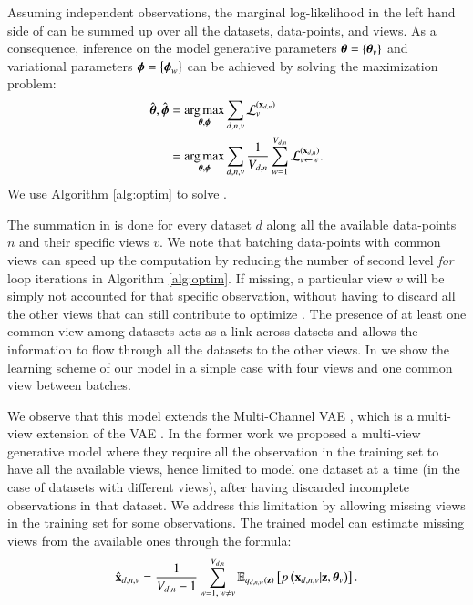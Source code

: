 Assuming independent observations, the marginal log-likelihood in the left hand side of  can be summed up over all the datasets, data-points, and views.
As a consequence, inference on the model generative parameters $\boldsymbol{\theta} = \left\{\boldsymbol{\theta}_v\right\}$ and variational parameters $\boldsymbol{\phi} = \left\{\boldsymbol{\phi}_w\right\}$ can be achieved by solving the maximization problem:
\begin{equation}\label{eq:argmax}
\begin{aligned}
\hat{\boldsymbol{\theta}}, \hat{\boldsymbol{\phi}} &= \underset{\boldsymbol{\theta}, \boldsymbol{\phi}}{\operatorname{arg\,max}} \sum_{d,n,v} \mathcal{L}_v^{(\mathbf{x}_{d,n})} \\
                           &= \underset{\boldsymbol{\theta}, \boldsymbol{\phi}}{\operatorname{arg\,max}} \sum_{d,n,v} \frac{1}{V_{d,n}} \sum_{w=1}^{V_{d,n}} \mathcal{L}_{v \leftarrow w}^{(\mathbf{x}_{d,n})}.
\end{aligned}
\end{equation}
We use Algorithm \ref{alg:optim} to solve .

The summation in  is done for every dataset $d$ along all the available data-points $n$ and their specific views $v$.
We note that batching data-points with common views can speed up the computation by reducing the number of second level \textit{for} loop iterations in Algorithm \ref{alg:optim}.
If missing, a particular view $v$ will be simply not accounted for that specific observation, without having to discard all the other views that can still contribute to optimize .
The presence of at least one common view among datasets acts as a link across datsets and allows the information to flow through all the datasets to the other views.
In  we show the learning scheme of our model in a simple case with four views and one common view between batches.



We observe that this model extends the Multi-Channel VAE \citep{Antelmi2019}, which is a multi-view extension of the VAE \citep{Kingma2013,Rezende2014}.
In the former work we proposed a multi-view generative model where they require all the observation in the training set to have all the available views, hence limited to model one dataset at a time (in the case of datasets with different views), after having discarded incomplete observations in that dataset.
We address this limitation by allowing missing views in the training set for some observations.
The trained model can estimate missing views from the available ones through the formula:
\begin{equation}\label{eq:reconstruction}
\begin{aligned}
\hat{\mathbf{x}}_{d,n,v} = \frac{1}{V_{d, n}-1} \sum_{w=1, \,w\neq v}^{V_{d, n}} \operatorname{\mathbb{E}}_{q_{d,n,w}(\mathbf{z})}\left[p\left(\mathbf{x}_{d,n,v}|\mathbf{z}, \boldsymbol{\theta}_v\right)\right].
\end{aligned}
\end{equation}

